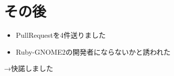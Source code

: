 \section{その後}

\begin{frame}
\begin{itemize}
\item PullRequestを4件送りました
\item Ruby-GNOME2の開発者にならないかと誘われた
\end{itemize}

→快諾しました
\end{frame}
